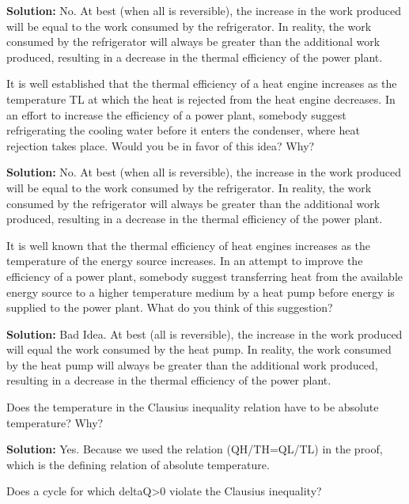 \begin{list}{\bf Question :~}{}
       {\bf Solution:} No. At best (when all is reversible), the increase in the work produced will be equal to the work consumed by the refrigerator. In reality, the work consumed by the refrigerator will always be greater than the additional work produced, resulting in a decrease in the thermal efficiency of the power plant.

%
     \item\label{Q25} It is well established that the thermal efficiency of a heat engine increases as the temperature TL at which the heat is rejected from the heat engine decreases. In an effort to increase the efficiency of a power plant, somebody suggest refrigerating the cooling water before it enters the condenser, where heat rejection takes place. Would you be in favor of this idea? Why?
%

       {\bf Solution:} No. At best (when all is reversible), the increase in the work produced will be equal to the work consumed by the refrigerator. In reality, the work consumed by the refrigerator will always be greater than the additional work produced, resulting in a decrease in the thermal efficiency of the power plant.

%
     \item\label{Q26} It is well known that the thermal efficiency of heat engines increases as the temperature of the energy source increases. In an attempt to improve the efficiency of a power plant, somebody suggest transferring heat from the available energy source to a higher temperature medium by a heat pump before energy is supplied to the power plant. What do you think of this suggestion?
%

       {\bf Solution:} Bad Idea. At best (all is reversible), the increase in the work produced will equal the work consumed by the heat pump. In reality, the work consumed by the heat pump will always be greater than the additional work produced, resulting in a decrease in the thermal efficiency of the power plant.

%
     \item\label{Q27} Does the temperature in the Clausius inequality relation have to be absolute temperature? Why?
%

       {\bf Solution:} Yes. Because we used the relation (QH/TH=QL/TL) in the proof, which is the defining relation of absolute temperature.

%
     \item\label{Q28} Does a cycle for which deltaQ>0 violate the Clausius inequality? 
%


\end{list}
